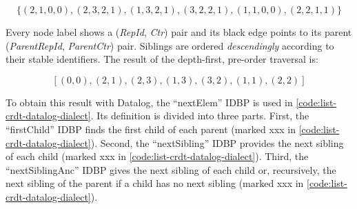 \[\{ (2,1,0,0), (2,3,2,1), (1,3,2,1), (3,2,2,1), (1,1,0,0), (2,2,1,1) \}\]

Every node label shows a (\textit{RepId}, \textit{Ctr}) pair and its black edge
points to its parent (\textit{ParentRepId}, \textit{ParentCtr}) pair.
Siblings are ordered \emph{descendingly} according to their stable identifiers.
The result of the depth-first, pre-order traversal is:

\[[ (0,0), (2,1), (2,3), (1,3), (3,2), (1,1), (2,2) ]\]

To obtain this result with Datalog, the ``nextElem'' \ac{IDBP} is used in
\ref{code:list-crdt-datalog-dialect}.
Its definition is divided into three parts.
First, the ``firstChild'' \ac{IDBP} finds the first child of each parent
(marked xxx in \ref{code:list-crdt-datalog-dialect}).
Second, the ``nextSibling'' \ac{IDBP} provides the next sibling of each child
(marked xxx in \ref{code:list-crdt-datalog-dialect}).
Third, the ``nextSiblingAnc'' \ac{IDBP} gives the next sibling of each child
or, recursively, the next sibling of the parent if a child has no next sibling
(marked xxx in \ref{code:list-crdt-datalog-dialect}).

